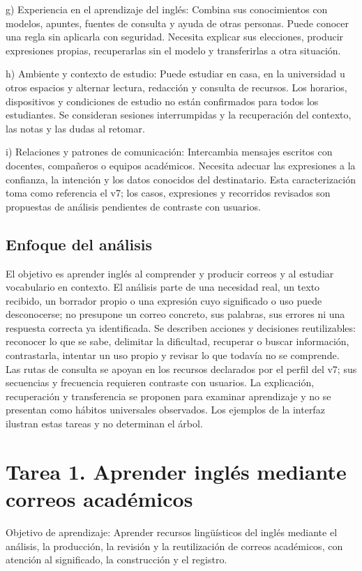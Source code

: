 \documentclass[10pt,a4paper]{article}
\begin{document}
g) Experiencia en el aprendizaje del inglés: Combina sus conocimientos con modelos, apuntes, fuentes de consulta y ayuda de otras personas. Puede conocer una regla sin aplicarla con seguridad. Necesita explicar sus elecciones, producir expresiones propias, recuperarlas sin el modelo y transferirlas a otra situación.\par
h) Ambiente y contexto de estudio: Puede estudiar en casa, en la universidad u otros espacios y alternar lectura, redacción y consulta de recursos. Los horarios, dispositivos y condiciones de estudio no están confirmados para todos los estudiantes. Se consideran sesiones interrumpidas y la recuperación del contexto, las notas y las dudas al retomar.\par
i) Relaciones y patrones de comunicación: Intercambia mensajes escritos con docentes, compañeros o equipos académicos. Necesita adecuar las expresiones a la confianza, la intención y los datos conocidos del destinatario. Esta caracterización toma como referencia el v7; los casos, expresiones y recorridos revisados son propuestas de análisis pendientes de contraste con usuarios.\par
\subsection*{Enfoque del análisis}
El objetivo es aprender inglés al comprender y producir correos y al estudiar vocabulario en contexto. El análisis parte de una necesidad real, un texto recibido, un borrador propio o una expresión cuyo significado o uso puede desconocerse; no presupone un correo concreto, sus palabras, sus errores ni una respuesta correcta ya identificada. Se describen acciones y decisiones reutilizables: reconocer lo que se sabe, delimitar la dificultad, recuperar o buscar información, contrastarla, intentar un uso propio y revisar lo que todavía no se comprende. Las rutas de consulta se apoyan en los recursos declarados por el perfil del v7; sus secuencias y frecuencia requieren contraste con usuarios. La explicación, recuperación y transferencia se proponen para examinar aprendizaje y no se presentan como hábitos universales observados. Los ejemplos de la interfaz ilustran estas tareas y no determinan el árbol.\par
\clearpage
\section*{Tarea 1. Aprender inglés mediante correos académicos}
Objetivo de aprendizaje: Aprender recursos lingüísticos del inglés mediante el análisis, la producción, la revisión y la reutilización de correos académicos, con atención al significado, la construcción y el registro.\par
\end{document}
